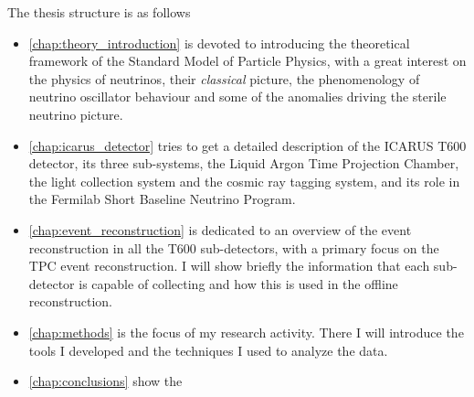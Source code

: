 The thesis structure is as follows
\begin{itemize}
    \item \autoref{chap:theory_introduction} is devoted to introducing the theoretical framework of the Standard Model of Particle Physics, with a great interest on the physics of neutrinos, their \emph{classical} picture, the phenomenology of neutrino oscillator behaviour and some of the anomalies driving the sterile neutrino picture. 
    \item \autoref{chap:icarus_detector} tries to get a detailed description of the ICARUS T600 detector, its three sub-systems, the Liquid Argon Time Projection Chamber, the light collection system and the cosmic ray tagging system, and its role in the Fermilab Short Baseline Neutrino Program. 
    \item \autoref{chap:event_reconstruction} is dedicated to an overview of the event reconstruction in all the T600 sub-detectors, with a primary focus on the TPC event reconstruction. I will show briefly the information that each sub-detector is capable of collecting and how this is used in the offline reconstruction. 
    \item \autoref{chap:methods} is the focus of my research activity. There I will introduce the tools I developed and the techniques I used to analyze the data. 
    \item \autoref{chap:conclusions} show the 
\end{itemize}

